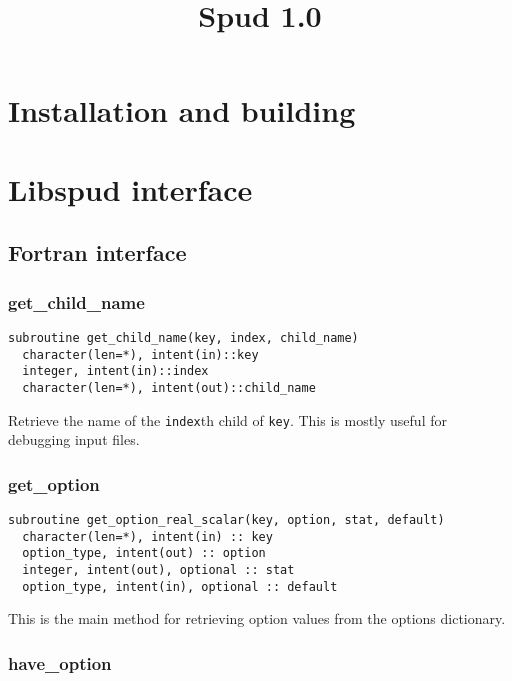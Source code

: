\documentclass[a4paper, 11pt]{book}
\title{Spud 1.0}
\begin{document}
\maketitle

\tableofcontents
\chapter{Installation and building}

\chapter{Libspud interface}

\section{Fortran interface}
\lstset{language=Fortran}

\subsection{get\_child\_name}

\begin{lstlisting}
subroutine get_child_name(key, index, child_name)    
  character(len=*), intent(in)::key 
  integer, intent(in)::index
  character(len=*), intent(out)::child_name
\end{lstlisting}

Retrieve the name of the \lstinline+index+th child of \lstinline+key+. This
is mostly useful for debugging input files.

\subsection{get\_option}

\begin{lstlisting}[emph=option_type,emphstyle=\textit]
subroutine get_option_real_scalar(key, option, stat, default)
  character(len=*), intent(in) :: key
  option_type, intent(out) :: option
  integer, intent(out), optional :: stat
  option_type, intent(in), optional :: default
\end{lstlisting}

This is the main method for retrieving option values from the options
dictionary. 

\subsection{have\_option}
\end{document}

